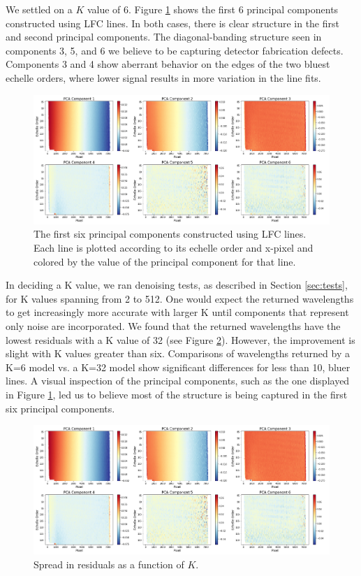 \documentclass[modern]{aastex63}
\begin{document}
We settled on a $K$ value of 6.  Figure \ref{fig:pcLfc} shows the first 6 principal components constructed using LFC lines.  In both cases, there is clear structure in the first and second principal components.  The diagonal-banding structure seen in components 3, 5, and 6 we believe to be capturing detector fabrication defects.  Components 3 and 4 show aberrant behavior on the edges of the two bluest echelle orders, where lower signal results in more variation in the line fits.

\begin{figure}[t]
\centering
\includegraphics[width=\textwidth]{Figures/pcsLfc6.png}
\caption{The first six principal components constructed using LFC lines.  Each line is plotted according to its echelle order and x-pixel and colored by the value of the principal component for that line.}
\label{fig:pcLfc}
\end{figure}

In deciding a K value, we ran denoising tests, as described in Section \ref{sec:tests}, for K values spanning from 2 to 512.  One would expect the returned wavelengths to get increasingly more accurate with larger K until components that represent only noise are incorporated.  We found that the returned wavelengths have the lowest residuals with a K value of 32 (see Figure \ref{fig:kvals}).  However, the improvement is slight with K values greater than six.  Comparisons of wavelengths returned by a K=6 model vs. a K=32 model show significant differences for less than 10, bluer lines.  A visual inspection of the principal components, such as the one displayed in Figure \ref{fig:pcLfc}, led us to believe most of the structure is being captured in the first six principal components.


\begin{figure}[t]
\centering
\includegraphics[width=.1\textwidth]{Figures/pcsLfc6.png}
\caption{Spread in residuals as a function of $K$.}
\label{fig:kvals}
\end{figure}
\end{document}
